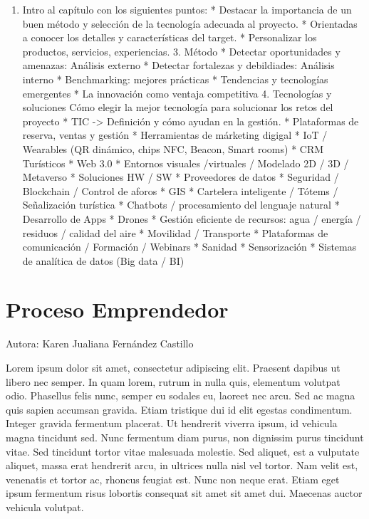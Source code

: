 \documentclass[
  letterpaper,
  DIV=11,
  numbers=noendperiod]{scrreprt}
\providecommand{\tightlist}{%
  \setlength{\itemsep}{0pt}\setlength{\parskip}{0pt}}\usepackage{longtable,booktabs,array}
\begin{document}
\begin{enumerate}
\def\labelenumi{\arabic{enumi}.}
\tightlist
\item
  Intro al capítulo con los siguientes puntos: * Destacar la importancia
  de un buen método y selección de la tecnología adecuada al proyecto. *
  Orientadas a conocer los detalles y características del target. *
  Personalizar los productos, servicios, experiencias. 3. Método *
  Detectar oportunidades y amenazas: Análisis externo * Detectar
  fortalezas y debildiades: Análisis interno * Benchmarking: mejores
  prácticas * Tendencias y tecnologías emergentes * La innovación como
  ventaja competitiva 4. Tecnologías y soluciones Cómo elegir la mejor
  tecnología para solucionar los retos del proyecto * TIC
  -\textgreater{} Definición y cómo ayudan en la gestión. * Plataformas
  de reserva, ventas y gestión * Herramientas de márketing digigal * IoT
  / Wearables (QR dinámico, chips NFC, Beacon, Smart rooms) * CRM
  Turísticos * Web 3.0 * Entornos visuales /virtuales / Modelado 2D / 3D
  / Metaverso * Soluciones HW / SW * Proveedores de datos * Seguridad /
  Blockchain / Control de aforos * GIS * Cartelera inteligente / Tótems
  / Señalización turística * Chatbots / procesamiento del lenguaje
  natural * Desarrollo de Apps * Drones * Gestión eficiente de recursos:
  agua / energía / residuos / calidad del aire * Movilidad / Transporte
  * Plataformas de comunicación / Formación / Webinars * Sanidad *
  Sensorización * Sistemas de analítica de datos (Big data / BI)
\end{enumerate}


\hypertarget{proceso-emprendedor}{%
\chapter{Proceso Emprendedor}\label{proceso-emprendedor}}

Autora: Karen Jualiana Fernández Castillo

Lorem ipsum dolor sit amet, consectetur adipiscing elit. Praesent
dapibus ut libero nec semper. In quam lorem, rutrum in nulla quis,
elementum volutpat odio. Phasellus felis nunc, semper eu sodales eu,
laoreet nec arcu. Sed ac magna quis sapien accumsan gravida. Etiam
tristique dui id elit egestas condimentum. Integer gravida fermentum
placerat. Ut hendrerit viverra ipsum, id vehicula magna tincidunt sed.
Nunc fermentum diam purus, non dignissim purus tincidunt vitae. Sed
tincidunt tortor vitae malesuada molestie. Sed aliquet, est a vulputate
aliquet, massa erat hendrerit arcu, in ultrices nulla nisl vel tortor.
Nam velit est, venenatis et tortor ac, rhoncus feugiat est. Nunc non
neque erat. Etiam eget ipsum fermentum risus lobortis consequat sit amet
sit amet dui. Maecenas auctor vehicula volutpat.
\end{document}
